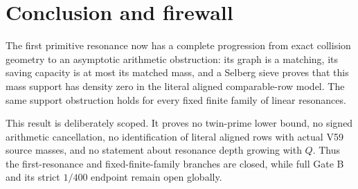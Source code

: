 \section{Conclusion and firewall}

The first primitive resonance now has a complete progression from exact collision
geometry to an asymptotic arithmetic obstruction: its graph is a matching, its saving
capacity is at most its matched mass, and a Selberg sieve proves that this mass support
has density zero in the literal aligned comparable-row model.  The same support
obstruction holds for every fixed finite family of linear resonances.

This result is deliberately scoped.  It proves no twin-prime lower bound, no signed
arithmetic cancellation, no identification of literal aligned rows with actual V59
source masses, and no statement about resonance depth growing with $Q$.  Thus the
first-resonance and fixed-finite-family branches are closed, while full Gate B and its
strict $1/400$ endpoint remain open globally.
